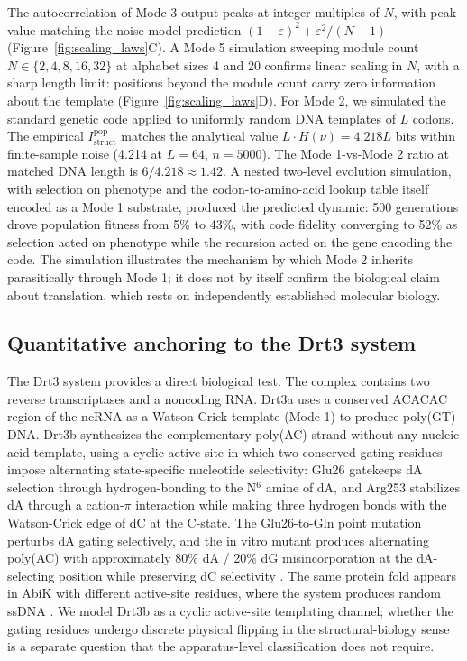 \documentclass[aps,prx,reprint,amsmath,amssymb,floatfix,superscriptaddress,nofootinbib]{revtex4-2}
\theoremstyle{plain-thm}
\theoremstyle{definition-thm}
\newcommand{\Istructpop}{I_{\mathrm{struct}}^{\mathrm{pop}}}
\begin{document}
The autocorrelation of Mode 3 output peaks at integer multiples of $N$, with peak value matching the noise-model prediction $(1 - \varepsilon)^2 + \varepsilon^2/(N - 1)$ (Figure~\ref{fig:scaling_laws}C). A Mode 5 simulation sweeping module count $N \in \{2, 4, 8, 16, 32\}$ at alphabet sizes 4 and 20 confirms linear scaling in $N$, with a sharp length limit: positions beyond the module count carry zero information about the template (Figure~\ref{fig:scaling_laws}D). For Mode 2, we simulated the standard genetic code applied to uniformly random DNA templates of $L$ codons. The empirical $\Istructpop$ matches the analytical value $L \cdot H(\nu) = 4.218L$ bits within finite-sample noise (4.214 at $L = 64$, $n = 5000$). The Mode 1-vs-Mode 2 ratio at matched DNA length is $6/4.218 \approx 1.42$. A nested two-level evolution simulation, with selection on phenotype and the codon-to-amino-acid lookup table itself encoded as a Mode 1 substrate, produced the predicted dynamic: 500 generations drove population fitness from 5\% to 43\%, with code fidelity converging to 52\% as selection acted on phenotype while the recursion acted on the gene encoding the code. The simulation illustrates the mechanism by which Mode 2 inherits parasitically through Mode 1; it does not by itself confirm the biological claim about translation, which rests on independently established molecular biology.

\subsection{Quantitative anchoring to the Drt3 system}

The Drt3 system \citep{Deng2026} provides a direct biological test. The complex contains two reverse transcriptases and a noncoding RNA. Drt3a uses a conserved ACACAC region of the ncRNA as a Watson-Crick template (Mode 1) to produce poly(GT) DNA. Drt3b synthesizes the complementary poly(AC) strand without any nucleic acid template, using a cyclic active site in which two conserved gating residues impose alternating state-specific nucleotide selectivity: Glu26 gatekeeps dA selection through hydrogen-bonding to the N$^6$ amine of dA, and Arg253 stabilizes dA through a cation-$\pi$ interaction while making three hydrogen bonds with the Watson-Crick edge of dC at the C-state. The Glu26-to-Gln point mutation perturbs dA gating selectively, and the in vitro mutant produces alternating poly(AC) with approximately 80\% dA / 20\% dG misincorporation at the dA-selecting position while preserving dC selectivity \citep[Fig. 4J]{Deng2026}. The same protein fold appears in AbiK with different active-site residues, where the system produces random ssDNA \citep{Deng2026}. We model Drt3b as a cyclic active-site templating channel; whether the gating residues undergo discrete physical flipping in the structural-biology sense is a separate question that the apparatus-level classification does not require.
\end{document}
